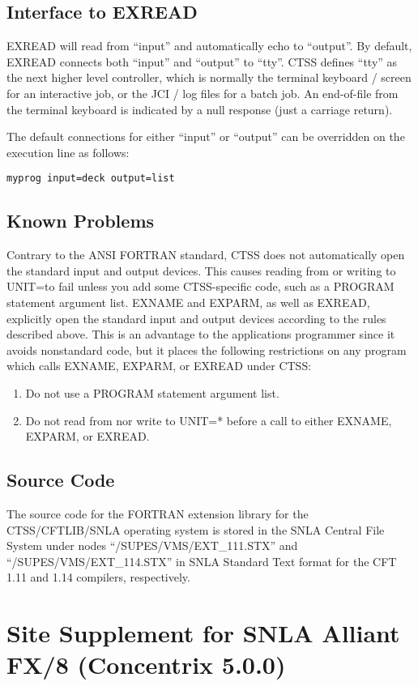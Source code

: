 \subsection{Interface to EXREAD}
EXREAD will read from ``input'' and automatically echo to ``output''.  By
default, EXREAD connects both ``input'' and ``output'' to ``tty''.  CTSS defines
``tty'' as the next higher level controller, which is normally the terminal
keyboard / screen for an interactive job, or the JCI / log files for a batch
job.  An end-of-file from the terminal keyboard is indicated by a null
response (just a carriage return).

The default connections for either ``input'' or ``output'' can be overridden on
the execution line as follows:

\verb+myprog input=deck output=list+


\subsection{Known Problems}
Contrary to the ANSI FORTRAN standard, CTSS does not automatically open the
standard input and output devices.  This causes reading from or writing to
UNIT=\last to fail unless you add some CTSS-specific code, such as a PROGRAM
statement argument list.  EXNAME and EXPARM, as well as EXREAD, explicitly
open the standard input and output devices according to the rules described
above.  This is an advantage to the applications programmer since it avoids
nonstandard code, but it places the following restrictions on any program
which calls EXNAME, EXPARM, or EXREAD under CTSS:
\begin{enumerate}
\item Do not use a PROGRAM statement argument list.

\item Do not read from nor write to UNIT=* before a call to either EXNAME,
        EXPARM, or EXREAD.
\end{enumerate}

\subsection{Source Code}
The source code for the FORTRAN extension library for the CTSS/CFTLIB/SNLA
operating system is stored in the SNLA Central File System under nodes
``/SUPES/VMS/EXT\_111.STX'' and ``/SUPES/VMS/EXT\_114.STX'' in SNLA Standard Text
format for the CFT 1.11 and 1.14 compilers, respectively.

\section{Site Supplement for SNLA Alliant FX/8 (Concentrix 5.0.0)}

